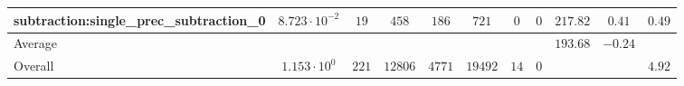 \begin{tabular}{|l|c|c|c|c|c|c|c|c|c|c|}
subtraction:single\_prec\_subtraction\_0         & $ 8.723 \cdot 10^{-2} $ & $ 19     $ & $ 458   $ & $ 186  $ & $ 721   $ & $ 0  $ & $ 0 $ & $ 217.82      $ & $ 0.41    $ & $ 0.49    $ \\
\hline
Average                                          & $                     $ & $        $ & $       $ & $      $ & $       $ & $    $ & $   $ & $ 193.68      $ & $ -0.24   $ & $         $ \\
\hline
Overall                                          & $ 1.153 \cdot 10^{0}  $ & $ 221    $ & $ 12806 $ & $ 4771 $ & $ 19492 $ & $ 14 $ & $ 0 $ & $             $ & $         $ & $ 4.92    $ \\
\hline
\end{tabular}
